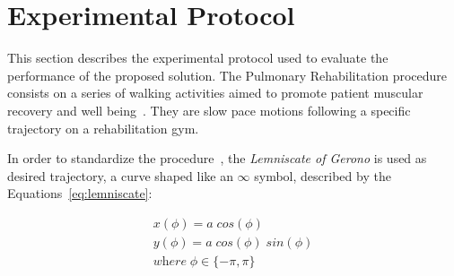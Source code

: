 \documentclass[journal]{IEEEtran}
\begin{document}


\section{Experimental Protocol} \label{experimental}

This section describes the experimental protocol used to evaluate the performance of the proposed solution.  The Pulmonary Rehabilitation procedure consists on a series of walking activities aimed to promote patient muscular recovery and well being~\cite{Wu2012}. They are slow pace motions following a specific trajectory on a rehabilitation gym.

In order to standardize the procedure~\cite{Sprunk2016}, the \textit{Lemniscate of Gerono} is used as desired trajectory, a curve shaped like an $\infty$ symbol, described by the Equations~\ref{eq:lemniscate}:

\begin{equation}
\begin{array}{ll}  
 x( \phi ) = a \; cos( \phi )     \\
 y( \phi ) = a \; cos ( \phi )   \; sin ( \phi )    \\ 
 \textit{where}  \; \phi \in \lbrace -\pi , \pi  \rbrace
\end{array}
\label{eq:lemniscate}
\end{equation}
\end{document}
